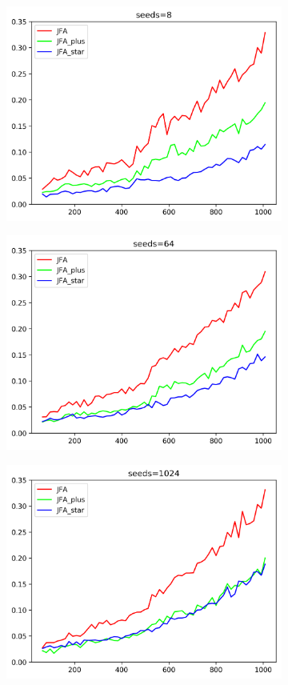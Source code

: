 \documentclass[aspectratio=169, 22pt]{beamer}
\begin{document}
\begin{frame}

\begin{figure}
\centering
\begin{subfigure}{.5\textwidth}
  \centering
  \includegraphics[width=0.7\linewidth]{./figure_seed_8.png}
  \label{fig:sub1}
\end{subfigure}%
\begin{subfigure}{.5\textwidth}
  \centering
  \includegraphics[width=0.7\linewidth]{./figure_seed_64.png}
  \label{fig:sub2}
\end{subfigure}
\begin{subfigure}{.5\textwidth}
  \centering
  \includegraphics[width=0.7\linewidth]{./figure_seed_1024.png}

\end{subfigure}
\end{figure}
\end{frame}
\end{document}
